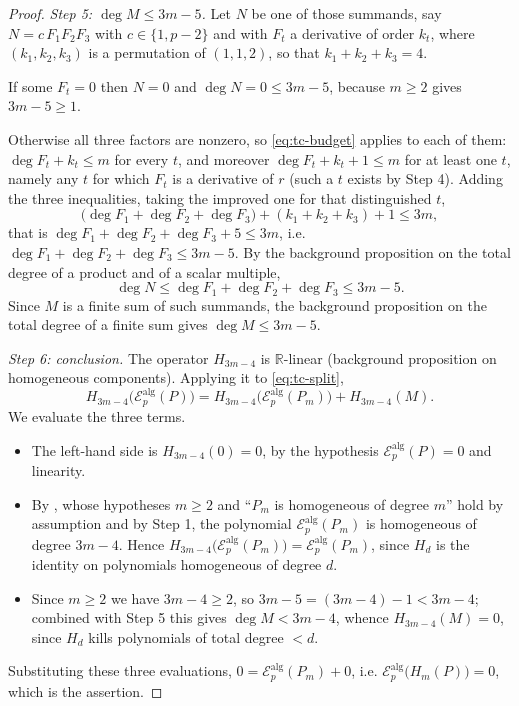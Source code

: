 \begin{proof}
\emph{Step 5: $\deg M\le 3m-5$.} Let $N$ be one of those summands, say
$N=c\,F_1F_2F_3$ with $c\in\{1,p-2\}$ and with $F_t$ a derivative of order
$k_t$, where $(k_1,k_2,k_3)$ is a permutation of $(1,1,2)$, so that
$k_1+k_2+k_3=4$.

If some $F_t=0$ then $N=0$ and $\deg N=0\le3m-5$, because $m\ge2$ gives
$3m-5\ge1$.

Otherwise all three factors are nonzero, so \eqref{eq:tc-budget} applies to each
of them: $\deg F_t+k_t\le m$ for every $t$, and moreover
$\deg F_t+k_t+1\le m$ for at least one $t$, namely any $t$ for which $F_t$ is a
derivative of $r$ (such a $t$ exists by Step 4). Adding the three inequalities,
taking the improved one for that distinguished $t$,
\[
  \bigl(\deg F_1+\deg F_2+\deg F_3\bigr)+(k_1+k_2+k_3)+1\le 3m,
\]
that is $\deg F_1+\deg F_2+\deg F_3+5\le3m$, i.e.
$\deg F_1+\deg F_2+\deg F_3\le3m-5$. By the background proposition on the total
degree of a product and of a scalar multiple,
\[
  \deg N\le\deg F_1+\deg F_2+\deg F_3\le3m-5 .
\]
Since $M$ is a finite sum of such summands, the background proposition on the
total degree of a finite sum gives $\deg M\le3m-5$.

\emph{Step 6: conclusion.} The operator $H_{3m-4}$ is $\mathbb{R}$-linear
(background proposition on homogeneous components). Applying it to
\eqref{eq:tc-split},
\[
  H_{3m-4}\bigl(\mathcal{E}^{\mathrm{alg}}_p(P)\bigr)
  =H_{3m-4}\bigl(\mathcal{E}^{\mathrm{alg}}_p(P_m)\bigr)+H_{3m-4}(M).
\]
We evaluate the three terms.
\begin{itemize}
\item The left-hand side is $H_{3m-4}(0)=0$, by the hypothesis
  $\mathcal{E}^{\mathrm{alg}}_p(P)=0$ and linearity.
\item By , whose hypotheses $m\ge2$ and ``$P_m$ is
  homogeneous of degree $m$'' hold by assumption and by Step 1, the polynomial
  $\mathcal{E}^{\mathrm{alg}}_p(P_m)$ is homogeneous of degree $3m-4$. Hence
  $H_{3m-4}\bigl(\mathcal{E}^{\mathrm{alg}}_p(P_m)\bigr)=\mathcal{E}^{\mathrm{alg}}_p(P_m)$,
  since $H_d$ is the identity on polynomials homogeneous of degree $d$.
\item Since $m\ge2$ we have $3m-4\ge2$, so $3m-5=(3m-4)-1<3m-4$; combined with
  Step 5 this gives $\deg M<3m-4$, whence $H_{3m-4}(M)=0$, since $H_d$ kills
  polynomials of total degree $<d$.
\end{itemize}
Substituting these three evaluations,
$0=\mathcal{E}^{\mathrm{alg}}_p(P_m)+0$, i.e.
$\mathcal{E}^{\mathrm{alg}}_p\bigl(H_m(P)\bigr)=0$, which is the assertion.
\end{proof}
